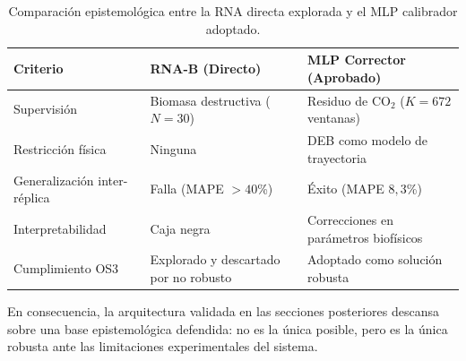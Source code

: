 \begin{table}[htbp]
\centering
\caption{Comparación epistemológica entre la RNA directa explorada y el MLP calibrador adoptado.}
\label{tab:comparativa_arquitecturas}
\begin{tabular}{p{4.2cm}p{4.5cm}p{4.5cm}}
\toprule
\textbf{Criterio} & \textbf{RNA-B (Directo)} & \textbf{MLP Corrector (Aprobado)} \\
\midrule
Supervisión & Biomasa destructiva ($N=30$) & Residuo de CO$_2$ ($K=672$ ventanas) \\
Restricción física & Ninguna & DEB como modelo de trayectoria \\
Generalización inter-réplica & Falla (MAPE $>40$\%) & Éxito (MAPE $8{,}3$\%) \\
Interpretabilidad & Caja negra & Correcciones en parámetros biofísicos \\
Cumplimiento OS3 & Explorado y descartado por no robusto & Adoptado como solución robusta \\
\bottomrule
\end{tabular}
\end{table}

En consecuencia, la arquitectura validada en las secciones posteriores descansa sobre una base epistemológica defendida: no es la única posible, pero es la única robusta ante las limitaciones experimentales del sistema.
